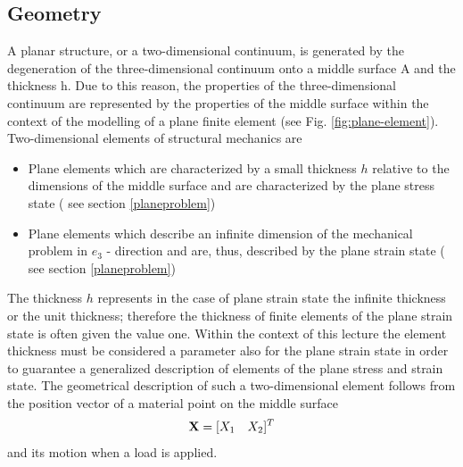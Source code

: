 \subsection{Geometry}
A planar structure, or a two-dimensional continuum, is generated by the degeneration of the
three-dimensional continuum onto a middle surface A and the thickness h. Due to this reason,
the properties of the three-dimensional continuum are represented by the properties of the
middle surface within the context of the modelling of a plane finite element (see Fig. \ref{fig:plane-element}).
Two-dimensional elements of structural mechanics are
\begin{itemize}
    \item Plane elements which are characterized by a small thickness $h$ relative to the dimensions of the middle surface and are characterized by the plane stress state ( see section \ref{planeproblem})
    
    \item Plane elements which describe an infinite dimension of the mechanical problem in $e _3$ - direction and are, thus, described by the plane strain state ( see section \ref{planeproblem}) 
\end{itemize}
\noindent
The thickness $h$ represents in the case of plane strain state the infinite thickness or the unit
thickness; therefore the thickness of finite elements of the plane strain state is often given the
value one. Within the context of this lecture the element thickness must be considered a parameter also for the plane strain state in order to guarantee a generalized description of elements of
the plane stress and strain state.
The geometrical description of such a two-dimensional element follows from the position vector
of a material point on the middle surface
\begin{equation}
    {\bf X}=[X_1 \quad X_2]^T
\end{equation}
and its motion when a load is applied.


